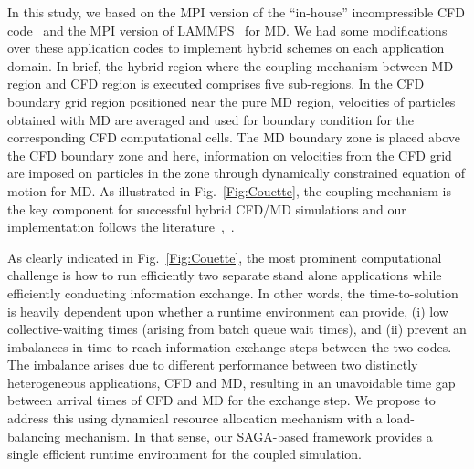 \documentclass[conference,final]{IEEEtran}
\begin{document}
In this study, we based on the MPI version of the ``in-house''
incompressible CFD code~\cite{Lee} and the MPI version of
LAMMPS~\cite{LAMMPS} for MD. We had some modifications over these
application codes to implement hybrid schemes on each application
domain. In brief, the hybrid region where the coupling mechanism
between MD region and CFD region is executed comprises five
sub-regions. In the CFD boundary grid region positioned near the pure
MD region, velocities of particles obtained with MD are averaged and
used for boundary condition for the corresponding CFD computational
cells. The MD boundary zone is placed above the CFD boundary zone and
here, information on velocities from the CFD grid are imposed on
particles in the zone through dynamically constrained equation of
motion for MD. As illustrated in Fig.~\ref{Fig:Couette}, the coupling
mechanism is the key component for successful hybrid CFD/MD
simulations and our implementation follows the
literature~\cite{Nie},~\cite{Yen}.



As clearly indicated in Fig.~\ref{Fig:Couette}, the most prominent
computational challenge is how to run efficiently two separate stand
alone applications while efficiently conducting information exchange.
In other words, the time-to-solution is heavily dependent upon whether
a runtime environment can provide, (i) low collective-waiting times
(arising from batch queue wait times), and (ii) prevent an imbalances
in time to reach information exchange steps between the two codes. The
imbalance arises due to different performance between two distinctly
heterogeneous applications, CFD and MD, resulting in an unavoidable
time gap between arrival times of CFD and MD for the exchange step. We
propose to address this using dynamical resource allocation mechanism
with a load-balancing mechanism. In that sense, our SAGA-based
framework provides a single efficient runtime environment for the
coupled simulation.
\end{document}
